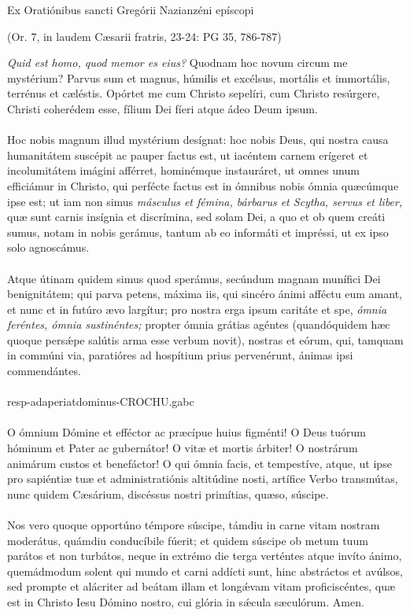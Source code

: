 \documentclass[options]{article}
\begin{document}
	Ex Oratiónibus sancti Gregórii Nazianzéni epíscopi
	\begin{flushright}
		(Or. 7, in laudem Cæsarii fratris, 23-24: PG 35, 786-787)
	\end{flushright}
\emph{Quid est homo, quod memor es eius?}
Quodnam hoc novum circum me mystérium? Parvus sum et magnus, húmilis et excélsus, mortális et immortális, terrénus et cæléstis. Opórtet me cum Christo sepelíri, cum Christo resúrgere, Christi coherédem esse, fílium Dei fíeri atque ádeo Deum ipsum. \\\\
 Hoc nobis magnum illud mystérium desígnat: hoc nobis Deus, qui nostra causa humanitátem suscépit ac pauper factus est, ut iacéntem carnem erígeret et incolumitátem imágini afférret, hominémque instauráret, ut omnes unum efficiámur in Christo, qui perfécte factus est in ómnibus nobis ómnia quæcúmque ipse est; ut iam non simus
  \emph{másculus et fémina, bárbarus et Scytha, servus et liber,}
  quæ sunt carnis insígnia et discrímina, sed solam Dei, a quo et ob quem creáti sumus, notam in nobis gerámus, tantum ab eo informáti et impréssi, ut ex ipso solo agnoscámus.\\\\
  
    Atque útinam quidem simus quod sperámus, secúndum magnam munífici Dei benignitátem; qui parva petens, máxima iis, qui sincéro ánimi afféctu eum amant, et nunc et in futúro ævo largítur; pro nostra erga ipsum caritáte et spe,
    \emph{ómnia feréntes, ómnia sustinéntes;}
    propter ómnia grátias agéntes (quandóquidem hæc quoque pers\'{æ}pe salútis arma esse verbum novit), nostras et eórum, qui, tamquam in commúni via, paratióres ad hospítium prius pervenérunt, ánimas ipsi commendántes. \\
    \\
    resp-adaperiatdominus-CROCHU.gabc\\
    \\
      O ómnium Dómine et efféctor ac præcípue huius figménti! O Deus tuórum hóminum et Pater ac gubernátor! O vitæ et mortis árbiter! O nostrárum animárum custos et benefáctor! O qui ómnia facis, et tempestíve, atque, ut ipse pro sapiéntiæ tuæ et administratiónis altitúdine nosti, artífice Verbo transmútas, nunc quidem Cæsárium, discéssus nostri primítias, quæso, súscipe. \\
      \\
       Nos vero quoque opportúno témpore súscipe, támdiu in carne vitam nostram moderátus, quámdiu conducíbile fúerit; et quidem súscipe ob metum tuum parátos et non turbátos, neque in extrémo die terga verténtes atque invíto ánimo, quemádmodum solent qui mundo et carni addícti sunt, hinc abstráctos et avúlsos, sed prompte et alácriter ad beátam illam et long\'{æ}vam vitam proficiscéntes, quæ est in Christo Iesu Dómino nostro, cui glória in s\'{æ}cula sæculórum. Amen.
    
    
    
\end{document}
